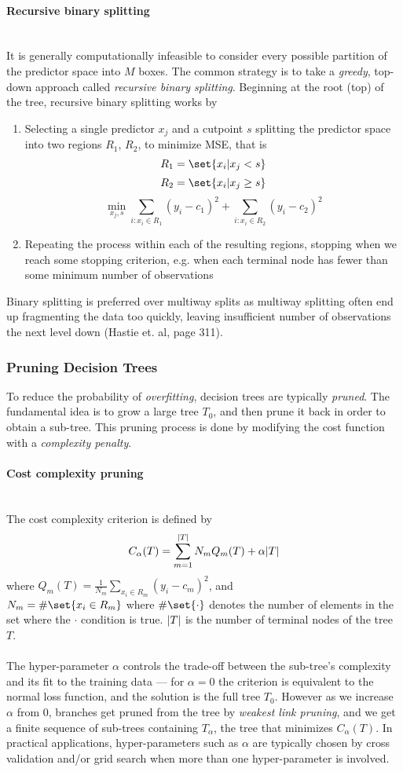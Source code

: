 \documentclass[10pt, a4paper, twocolumn]{article}
\newcommand{\myparagraph}[1]{\paragraph{#1}\mbox{}\\}
\DeclarePairedDelimiter\abs{\lvert}{\rvert}%
\DeclarePairedDelimiter\set\{\}
\begin{document}
			\myparagraph{Recursive binary splitting}
				It is generally computationally infeasible to consider every possible partition of the predictor space into $M$ boxes. The common strategy is to take a \emph{greedy}, top-down approach called \emph{recursive binary splitting}. Beginning at the root (top) of the tree, recursive binary splitting works by 
					\begin{enumerate}
						\item Selecting a single predictor $x_j$ and a cutpoint $s$ splitting the predictor space into two regions $R_1$, $R_2$, to minimize MSE, that is
							$$R_1 = \set{x_i|x_j<s}$$
							$$R_2 = \set{x_i|x_j\geq s}$$
							$$\min_{x_j, s} \sum_{i:x_i\in R_1} (y_i-c_1)^2 + \sum_{i:x_i\in R_2} (y_i-c_2)^2$$
						\item Repeating the process within each of the resulting regions, stopping when we reach some stopping criterion, e.g. when each terminal node has fewer than some minimum number of observations
					\end{enumerate}
				
				Binary splitting is preferred over multiway splits as multiway splitting often end up fragmenting the data too quickly, leaving insufficient number of observations the next level down (Hastie et. al, page 311)\cite{ElementsOfStatLearning}.
			\subsubsection{Pruning Decision Trees}
				To reduce the probability of \emph{overfitting}, decision trees are typically \emph{pruned}. The fundamental idea is to grow a large tree $T_0$, and then prune it back in order to obtain a sub-tree. This pruning process is done by modifying the cost function with a \emph{complexity penalty}.
				\myparagraph{Cost complexity pruning}
					The cost complexity criterion is defined by
						$$C_{\alpha}(T)=\sum_{m=1}^{\abs{T}}N_m Q_m(T)+\alpha\abs{T}$$
					where $Q_m (T) = \frac{1}{N_m}\sum_{x_i \in R_m}(y_i-\hat{c_m})^2$, and\\ $N_m=\#\set{x_i\in R_m}$ where $\#\set{\cdot}$ denotes the number of elements in the set where the $\cdot$ condition is true. $\abs{T}$ is the number of terminal nodes of the tree $T$.\\\\
					
					The hyper-parameter $\alpha$ controls the trade-off between the sub-tree's complexity and its fit to the training data --- for $\alpha=0$ the criterion is equivalent to the normal loss function, and the solution is the full tree $T_0$. However as we increase $\alpha$ from $0$, branches get pruned from the tree by \emph{weakest link pruning}, and we get a finite sequence of sub-trees containing $T_\alpha$, the tree that minimizes $C_{\alpha}(T)$. In practical applications, hyper-parameters such as $\alpha$ are typically chosen by cross validation and/or grid search when more than one hyper-parameter is involved.
							
\end{document}
